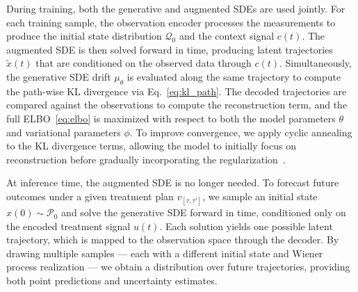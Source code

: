 \documentclass[preprint,12pt]{elsarticle}
\begin{document}
During training, both the generative and augmented SDEs are used jointly. For each training sample, the observation encoder processes the measurements to produce the initial state distribution $\mathcal{Q}_0$ and the context signal $c(t)$. The augmented SDE is then solved forward in time, producing latent trajectories $\tilde{x}(t)$ that are conditioned on the observed data through $c(t)$. Simultaneously, the generative SDE drift $\mu_\theta$ is evaluated along the same trajectory to compute the path-wise KL divergence via Eq.~\eqref{eq:kl_path}. The decoded trajectories are compared against the observations to compute the reconstruction term, and the full ELBO~\eqref{eq:elbo} is maximized with respect to both the model parameters $\theta$ and variational parameters $\phi$. To improve convergence, we apply cyclic annealing to the KL divergence terms, allowing the model to initially focus on reconstruction before gradually incorporating the regularization~\citep{fu2019cyclical}.

At inference time, the augmented SDE is no longer needed. To forecast future outcomes under a given treatment plan $v_{[\tau, \tau']}$, we sample an initial state $x(0) \sim \mathcal{P}_0$ and solve the generative SDE forward in time, conditioned only on the encoded treatment signal $u(t)$. Each solution yields one possible latent trajectory, which is mapped to the observation space through the decoder. By drawing multiple samples --- each with a different initial state and Wiener process realization --- we obtain a distribution over future trajectories, providing both point predictions and uncertainty estimates.
\end{document}
